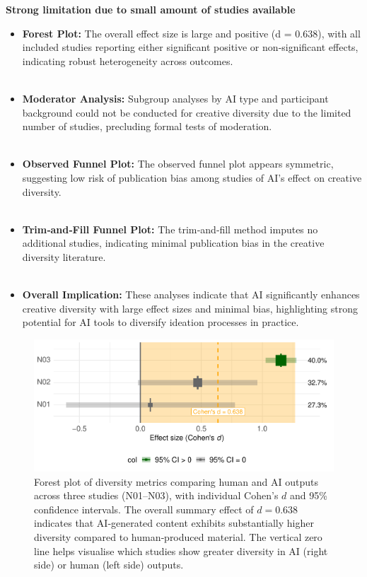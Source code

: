 \documentclass[acmsmall,authorversion]{acmart}
\begin{document}
\textbf{Strong limitation due to small amount of studies available}
\begin{itemize}
  \item \textbf{Forest Plot:} The overall effect size is large and positive (d = 0.638), with all included studies reporting either significant positive or non‐significant effects, indicating robust heterogeneity across outcomes.
  \\ \\
  \item \textbf{Moderator Analysis:} Subgroup analyses by AI type and participant background could not be conducted for creative diversity due to the limited number of studies, precluding formal tests of moderation.
  \\ \\
  \item \textbf{Observed Funnel Plot:} The observed funnel plot appears symmetric, suggesting low risk of publication bias among studies of AI’s effect on creative diversity.
  \\ \\
  \item \textbf{Trim‐and‐Fill Funnel Plot:} The trim‐and‐fill method imputes no additional studies, indicating minimal publication bias in the creative diversity literature.
  \\ \\
  \item \textbf{Overall Implication:} These analyses indicate that AI significantly enhances creative diversity with large effect sizes and minimal bias, highlighting strong potential for AI tools to diversify ideation processes in practice.
\end{itemize}

\begin{figure}[H]
  \centering
  \includegraphics[width=\linewidth]{plot_diversity_forest}
  \caption{Forest plot of diversity metrics comparing human and AI outputs across three studies (N01–N03), with individual Cohen’s $d$ and 95\% confidence intervals. The overall summary effect of $d = 0.638$ indicates that AI‐generated content exhibits substantially higher diversity compared to human‐produced material. The vertical zero line helps visualise which studies show greater diversity in AI (right side) or human (left side) outputs.}
  \label{fig:diversity_forest}
\end{figure}
\end{document}
